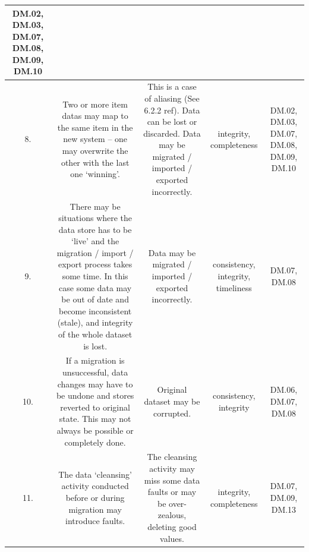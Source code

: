 \begin{longtable}{|C{}|C{}|C{}|C{}|C{}|}
DM.02, DM.03, DM.07, DM.08, DM.09, DM.10\\\hline
%
8.&
Two or more \glspl{item data} may map to the same item in the new system – one may overwrite the other with the last one ‘winning’.&
This is a case of aliasing (See 6.2.2 ref). Data can be lost or discarded. Data may be migrated / imported / exported incorrectly.&
\Gls{integrity}, \gls{completeness}&
DM.02, DM.03, DM.07, DM.08, DM.09, DM.10\\\hline
%
9.&
There may be situations where the data store has to be ‘live’ and the migration / import / export process takes some time.
In this case some data may be out of date and become inconsistent (stale), and \gls{integrity} of the whole \gls{dataset} is lost.&
Data may be migrated / imported / exported incorrectly.&
\Gls{consistency}, \gls{integrity}, \gls{timeliness}&
DM.07, DM.08\\\hline
%
10.&
If a migration is unsuccessful, data changes may have to be undone and stores reverted to original state.
This may not always be possible or completely done.&
Original \gls{dataset} may be corrupted.&
\Gls{consistency}, \Gls{integrity}&
DM.06, DM.07, DM.08\\\hline
%
11.&
The data ‘cleansing’ activity conducted before or during migration may introduce faults.&
The cleansing activity may miss some data faults or may be over-zealous, deleting good values.&
\Gls{integrity}, \gls{completeness}&
DM.07, DM.09, DM.13\\\hline
\end{longtable}
